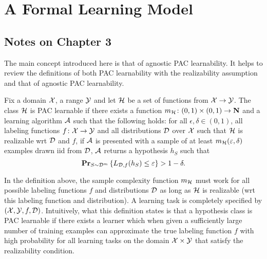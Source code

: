\chapter{A Formal Learning Model}

\section*{Notes on Chapter 3}

The main concept introduced here is that of agnostic PAC learnability. It helps to
review the definitions of both PAC learnability with the realizability assumption
and that of agnostic PAC learnability.

\begin{definition}
Fix a domain $\mathcal{X}$, a range $\mathcal{Y}$ and let $\mathcal{H}$ be a set of functions
from $\mathcal{X} \rightarrow \mathcal{Y}$. The class $\mathcal{H}$ is PAC learnable if there
exists a function $m_{\mathcal{H}} \colon (0, 1) \times (0, 1) \rightarrow \mathbf{N}$
and a learning algorithm $\mathcal{A}$ such that the following holds: for all
$\epsilon, \delta \in (0, 1)$, all labeling functions $f \colon \mathcal{X}
\rightarrow \mathcal{Y}$ and all distributions $\mathcal{D}$ over $\mathcal{X}$ such that
$\mathcal{H}$ is realizable wrt $\mathcal{D}$ and $f$, if $\mathcal{A}$ is presented with a
sample of at least $m_{\mathcal{H}}(\varepsilon, \delta)$ examples drawn iid from
$\mathcal{D}$, $\mathcal{A}$ returns a hypothesis $h_S$ such that
\[
     \mathbf{Pr}_{S \sim \mathcal{D}^m} \left \{ L_{\mathcal{D}, f} (h_S) \leq \varepsilon \right \}
        > 1 - \delta.
\]
\end{definition}

In the definition above, the sample complexity function $m_{\mathcal{H}}$ must work
for all possible labeling functions $f$ and distributions $\mathcal{D}$ as long as
$\mathcal{H}$ is realizable (wrt this labeling function and distribution). A
learning task is completely specified by $(\mathcal{X}, \mathcal{Y}, f, \mathcal{D})$.
Intuitively, what this definition states is that a hypothesis class is PAC
learnable if there exists a learner which when given a sufficiently large
number of training examples can approximate the true labeling function $f$ with
high probability for all learning tasks on the domain $\mathcal{X} \times \mathcal{Y}$ that
satisfy the realizability condition.

